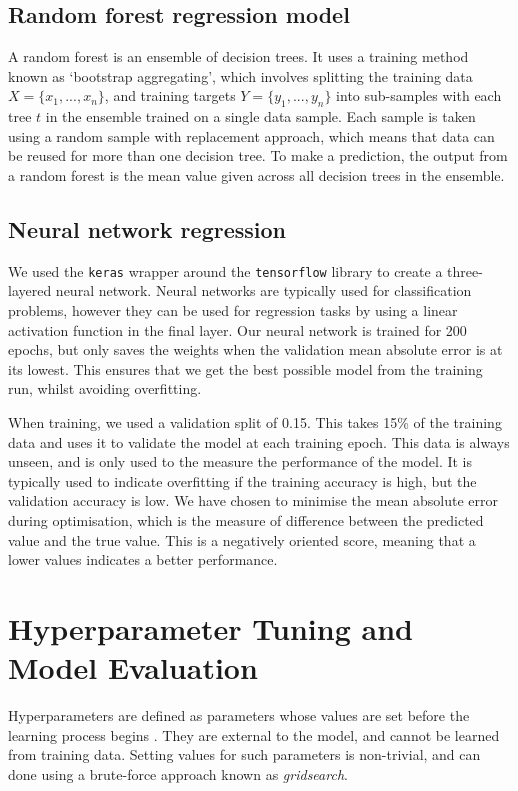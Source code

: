 \documentclass[11pt,conference]{IEEEtran}
\begin{document}
\subsection{Random forest regression model}
A random forest is an ensemble of decision trees. It uses a training method known as `bootstrap aggregating’, which involves splitting the training data $X=\{x_{1},...,x_{n}\}$, and training targets $Y=\{y_{1},...,y_{n}\}$ into sub-samples with each tree $t$ in the ensemble trained on a single data sample. Each sample is taken using a random sample with replacement approach, which means that data can be reused for more than one decision tree. To make a prediction, the output from a random forest is the mean value given across all decision trees in the ensemble.

\subsection{Neural network regression}
We used the \texttt{keras} wrapper around the \texttt{tensorflow} library to create a three-layered neural network. Neural networks are typically used for classification problems, however they can be used for regression tasks by using a linear activation function in the final layer. Our neural network is trained for 200 epochs, but only saves the weights when the validation mean absolute error is at its lowest. This ensures that we get the best possible model from the training run, whilst avoiding overfitting.

When training, we used a validation split of 0.15. This takes 15\% of the training data and uses it to validate the model at each training epoch. This data is always unseen, and is only used to the measure the performance of the model. It is typically used to indicate overfitting if the training accuracy is high, but the validation accuracy is low. We have chosen to minimise the mean absolute error during optimisation, which is the measure of difference between the predicted value and the true value. This is a negatively oriented score, meaning that a lower values indicates a better performance. 

\section{Hyperparameter Tuning and Model Evaluation}
Hyperparameters are defined as parameters whose values are set before the learning process begins \cite{agrawal_agrawal_2019}. They are external to the model, and cannot be learned from training data. Setting values for such parameters is non-trivial, and can done using a brute-force approach known as \textit{gridsearch}.
\end{document}
